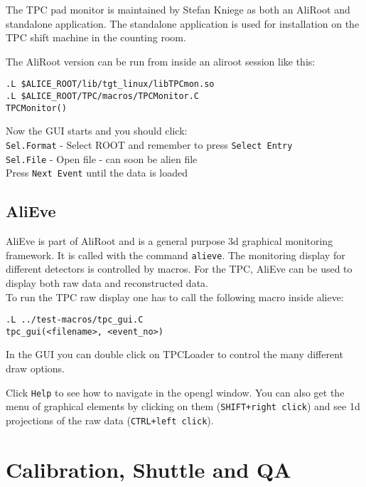 \documentclass[a4paper,12pt]{article}
\begin{document}
The TPC pad monitor is maintained by Stefan Kniege as both an AliRoot
and standalone application. The standalone application is used for
installation on the TPC shift machine in the counting room.

The AliRoot version can be run from inside an aliroot session like this:

\begin{verbatim}
.L $ALICE_ROOT/lib/tgt_linux/libTPCmon.so
.L $ALICE_ROOT/TPC/macros/TPCMonitor.C
TPCMonitor()
\end{verbatim}

Now the GUI starts and you should click:\\
\texttt{Sel.Format} - Select ROOT and remember to press 
\texttt{Select Entry}\\
\texttt{Sel.File} - Open file - can soon be alien file\\
Press \texttt{Next Event} until the data is loaded\\

\subsection{AliEve}

AliEve is part of AliRoot and is a general purpose 3d graphical
monitoring framework. It is called with the command
\texttt{alieve}. The monitoring display for different detectors is
controlled by macros. For the TPC, AliEve can be used to display both
raw data and reconstructed data.\\

To run the TPC raw display one has to call the following macro inside alieve:

\begin{verbatim}
.L ../test-macros/tpc_gui.C 
tpc_gui(<filename>, <event_no>) 
\end{verbatim}

In the GUI you can double click on TPCLoader to control the many
different draw options. 

Click \texttt{Help} to see how to navigate in the opengl window. You
can also get the menu of graphical elements by clicking on them
(\texttt{SHIFT+right click}) and see 1d projections of the raw data
(\texttt{CTRL+left click}).


\newpage

\section{Calibration, Shuttle and QA}
\end{document}
